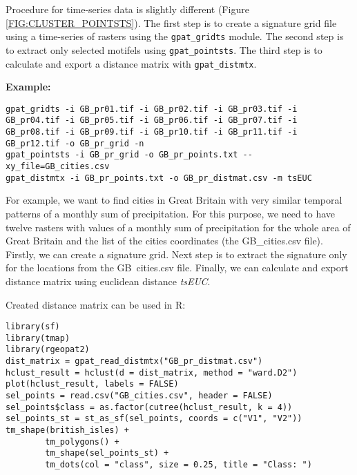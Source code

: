Procedure for time-series data is slightly different (Figure \ref{FIG:CLUSTER_POINTSTS}).
The first step is to create a signature grid file using a time-series of rasters using the {\tt gpat\_gridts} module.
The second step is to extract only selected motifels using {\tt gpat\_pointsts}.
The third step is to calculate and export a distance matrix with {\tt gpat\_distmtx}.

{\bf Example:}

\begin{minipage}{\linewidth}
\begin{lstlisting}
gpat_gridts -i GB_pr01.tif -i GB_pr02.tif -i GB_pr03.tif -i GB_pr04.tif -i GB_pr05.tif -i GB_pr06.tif -i GB_pr07.tif -i GB_pr08.tif -i GB_pr09.tif -i GB_pr10.tif -i GB_pr11.tif -i GB_pr12.tif -o GB_pr_grid -n
gpat_pointsts -i GB_pr_grid -o GB_pr_points.txt --xy_file=GB_cities.csv
gpat_distmtx -i GB_pr_points.txt -o GB_pr_distmat.csv -m tsEUC 
\end{lstlisting}
\end{minipage}

For example, we want to find cities in Great Britain with very similar temporal patterns of a monthly sum of precipitation. 
For this purpose, we need to have twelve rasters with values of a monthly sum of precipitation for the whole area of Great Britain and the list of the cities coordinates (the GB\_cities.csv file).
Firstly, we can create a signature grid. 
Next step is to extract the signature only for the locations from the GB\ cities.csv file.
Finally, we can calculate and export distance matrix using euclidean distance {\it tsEUC}.

Created distance matrix can be used in R:

\begin{minipage}{\linewidth}
\begin{lstlisting}
library(sf)
library(tmap)
library(rgeopat2)
dist_matrix = gpat_read_distmtx("GB_pr_distmat.csv")
hclust_result = hclust(d = dist_matrix, method = "ward.D2")
plot(hclust_result, labels = FALSE)
sel_points = read.csv("GB_cities.csv", header = FALSE) 
sel_points$class = as.factor(cutree(hclust_result, k = 4))
sel_points_st = st_as_sf(sel_points, coords = c("V1", "V2"))
tm_shape(british_isles) +
        tm_polygons() +
        tm_shape(sel_points_st) +
        tm_dots(col = "class", size = 0.25, title = "Class: ")
\end{lstlisting}
\end{minipage}

